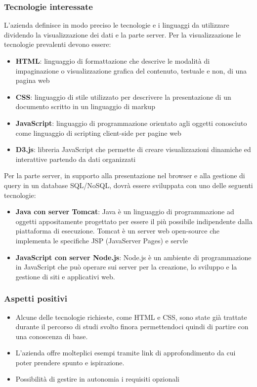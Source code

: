 		\subsubsection{Tecnologie interessate}
			L’azienda definisce in modo preciso le tecnologie e i linguaggi da utilizzare dividendo la visualizzazione dei dati e la parte server.
			Per la visualizzazione le tecnologie prevalenti devono essere:
			\begin{itemize}
				\item\textbf{HTML}:  linguaggio di formattazione che descrive le modalità di impaginazione o visualizzazione grafica del contenuto, testuale e non, di una pagina web
				\item\textbf{CSS}: linguaggio di stile utilizzato per descrivere la presentazione di un documento scritto in un linguaggio di markup
				\item\textbf{JavaScript}:  linguaggio di programmazione orientato agli oggetti conosciuto come linguaggio di scripting client-side per pagine web
				\item\textbf{D3.js}:  libreria JavaScript che permette di creare visualizzazioni dinamiche ed interattive partendo da dati organizzati
			\end{itemize}
			Per la parte server, in supporto alla presentazione nel browser e alla gestione di query in un database SQL/NoSQL, dovrà essere sviluppata con uno delle seguenti tecnologie:
			\begin{itemize}
				\item\textbf{Java con server Tomcat}: Java è un linguaggio di programmazione ad oggetti appositamente progettato per essere il più possibile indipendente dalla piattaforma di esecuzione. Tomcat è un server web open-source che implementa le specifiche JSP (JavaServer Pages) e servle
				\item\textbf{JavaScript con server Node.js}: Node.js è un ambiente di programmazione in JavaScript che può operare sui server per la creazione, lo sviluppo e la gestione di siti e applicativi web.
			\end{itemize}

			
		\subsubsection{Aspetti positivi}
			\begin{itemize}
				\item Alcune delle tecnologie richieste, come HTML e CSS, sono state già trattate durante il percorso di studi svolto finora permettendoci quindi di partire con una conoscenza di base.
				\item L’azienda offre molteplici esempi tramite link di approfondimento da cui poter 	prendere spunto e ispirazione.
				\item Possibilità di gestire in autonomia i requisiti opzionali
 			\end{itemize}
			
